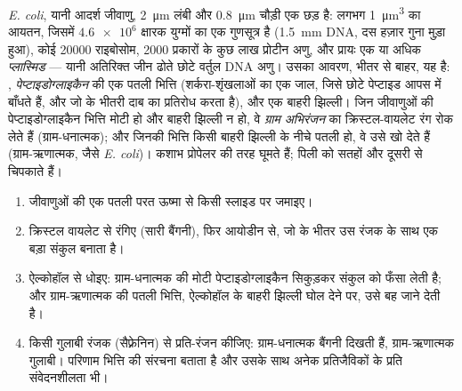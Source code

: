 \begin{proposition}[जीवाणु कोशिका]\label{prop:b1:cell-unit-of-life:bacterium}
\emph{E. coli}, यानी आदर्श जीवाणु, \qty{2}{\micro m} लंबी और
\qty{0.8}{\micro m} चौड़ी एक छड़ है: लगभग \qty{1}{\micro m^3} का आयतन,
जिसमें $\num{4.6e6}$ क्षारक युग्मों का एक गुणसूत्र है (\qty{1.5}{mm}
DNA, दस हज़ार गुना मुड़ा हुआ), कोई \num{20000} राइबोसोम, \num{2000}
प्रकारों के कुछ लाख प्रोटीन अणु, और प्रायः एक या अधिक
\emph{प्लास्मिड} --- यानी अतिरिक्त जीन ढोते छोटे वर्तुल
DNA अणु। उसका आवरण, भीतर से बाहर, यह है: ,
\emph{पेप्टाइडोग्लाइकैन} की एक पतली भित्ति
(शर्करा-शृंखलाओं का एक जाल, जिसे छोटे पेप्टाइड आपस में बाँधते हैं, और जो
 के भीतरी दाब का प्रतिरोध करता है), और एक बाहरी झिल्ली। जिन
जीवाणुओं की पेप्टाइडोग्लाइकैन भित्ति मोटी हो और बाहरी झिल्ली न हो, वे
\emph{ग्राम अभिरंजन} का क्रिस्टल-वायलेट रंग रोक
लेते हैं (ग्राम-धनात्मक); और जिनकी भित्ति किसी बाहरी झिल्ली के नीचे पतली
हो, वे उसे खो देते हैं (ग्राम-ऋणात्मक, जैसे \emph{E. coli})। कशाभ
प्रोपेलर की तरह घूमते हैं; पिली  को सतहों और दूसरी  से
चिपकाते हैं।
\end{proposition}

\begin{method}[ग्राम अभिरंजन]\label{met:b1:cell-unit-of-life:gram}
\begin{enumerate}
  \item जीवाणुओं की एक पतली परत ऊष्मा से किसी स्लाइड पर जमाइए।
  \item क्रिस्टल वायलेट से रंगिए (सारी  बैंगनी), फिर आयोडीन से,
        जो  के भीतर उस रंजक के साथ एक बड़ा संकुल बनाता है।
  \item ऐल्कोहॉल से धोइए: ग्राम-धनात्मक  की मोटी
        पेप्टाइडोग्लाइकैन सिकुड़कर संकुल को फँसा लेती है; और
        ग्राम-ऋणात्मक  की पतली भित्ति, ऐल्कोहॉल के बाहरी झिल्ली
        घोल देने पर, उसे बह जाने देती है।
  \item किसी गुलाबी रंजक (सैफ़्रेनिन) से प्रति-रंजन कीजिए:
        ग्राम-धनात्मक  बैंगनी दिखती हैं, ग्राम-ऋणात्मक गुलाबी।
        परिणाम भित्ति की संरचना बताता है और उसके साथ अनेक प्रतिजैविकों
        के प्रति संवेदनशीलता भी।
\end{enumerate}
\end{method}

